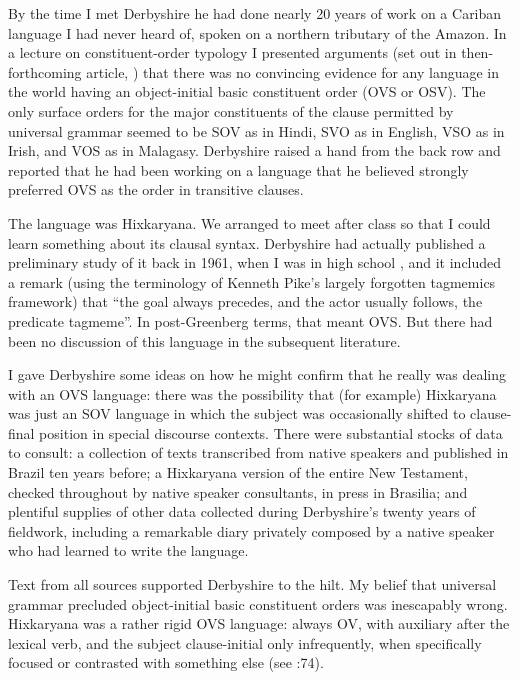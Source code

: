 \documentclass[output=paper,colorlinks,citecolor=brown
]{langscibook}
\begin{document}
By the time I met Derbyshire he had done nearly 20 years of work on
a Cariban language I had never heard of, spoken on a northern tributary
of the Amazon. In a lecture on constituent-order typology I presented
arguments (set out in then-forthcoming article, \citet{Pullum77})
that there was no convincing evidence for any language in the world
having an object-initial basic constituent order (OVS or OSV). The
only surface orders for the major constituents of the clause permitted
by universal grammar seemed to be SOV as in Hindi, SVO as in English,
VSO as in Irish, and VOS as in Malagasy. Derbyshire raised a hand
from the back row and reported that he had been working on a language
that he believed strongly preferred OVS as the order in transitive
clauses.

The language was Hixkaryana. We arranged to meet after class so that
I could learn something about its clausal syntax. Derbyshire had actually
published a preliminary study of it back in 1961, when I was in high
school \citep{Derbyshire61}, and it included a remark (using the
terminology of Kenneth Pike's largely forgotten tagmemics framework)
that ``the goal always precedes, and the actor usually follows, the
predicate tagmeme''. In post-Greenberg terms, that meant OVS. But
there had been no discussion of this language in the subsequent
literature.

I gave Derbyshire some ideas on how he might confirm that he really
was dealing with an OVS language: there was the possibility that
(for example) Hixkaryana was just an SOV language in which the subject
was occasionally shifted to clause-final position in special discourse
contexts. There were substantial stocks of data to consult: a
collection of texts transcribed from native speakers and published
in Brazil ten years before; a Hixkaryana version of the entire New
Testament, checked throughout by native speaker consultants, in press
in Brasilia; and plentiful supplies of other data collected during
Derbyshire's twenty years of fieldwork, including a remarkable diary
privately composed by a native speaker who had learned to write the
language.

Text from all sources supported Derbyshire to the hilt. My belief
that universal grammar precluded object-initial basic constituent
orders was inescapably wrong. Hixkaryana was a rather rigid OVS
language: always OV, with auxiliary after the lexical verb, and
the subject clause-initial only infrequently, when specifically
focused or contrasted with something else (see
\citealt{Derbyshire85}:74).
\end{document}
